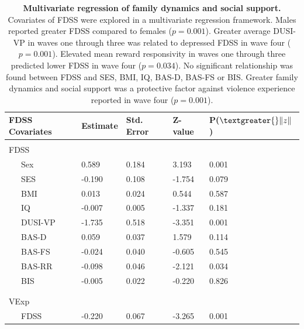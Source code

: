 \documentclass[utf8]{article}
\begin{document}
\begin{table}[h!]
\begin{tabular}{lllll}
FDSS Covariates & Estimate & Std. Error & Z-value & P($\textgreater{}\|z\|$) \\ \hline
           &          &            &         &                          \\
FDSS       &          &            &         &                          \\
\ \ \ Sex        & 0.589    & 0.184      & 3.193   & 0.001                    \\
\ \ \ SES        & -0.190   & 0.108      & -1.754  & 0.079                    \\
\ \ \ BMI        & 0.013    & 0.024      & 0.544   & 0.587                    \\
\ \ \ IQ         & -0.007   & 0.005      & -1.337  & 0.181                    \\
\ \ \ DUSI-VP    & -1.735   & 0.518      & -3.351  & 0.001                    \\
\ \ \ BAS-D      & 0.059    & 0.037      & 1.579   & 0.114                    \\
\ \ \ BAS-FS     & -0.024   & 0.040      & -0.605  & 0.545                    \\
\ \ \ BAS-RR     & -0.098   & 0.046      & -2.121  & 0.034                    \\
\ \ \ BIS        & -0.005   & 0.022      & -0.220  & 0.826                    \\
           &          &            &         &                          \\ \hline \\
VExp       &          &            &         &                          \\
\ \ \ FDSS       & -0.220   & 0.067      & -3.265  & 0.001                   
\end{tabular}
\caption{\textbf{Multivariate regression of family dynamics and social support.} Covariates of FDSS were explored in a multivariate regression framework. Males reported greater FDSS compared to females ($p=0.001$). Greater average DUSI-VP in waves one through three was related to depressed FDSS in wave four ($p=0.001$). Elevated mean reward responsivity in waves one through three predicted lower FDSS in wave four ($p=0.034$). No significant relationship was found between FDSS and SES, BMI, IQ, BAS-D, BAS-FS or BIS. Greater family dynamics and social support was a protective factor against violence experience reported in wave four ($p=0.001$). \label{tab:6}}
\end{table}
\end{document}
